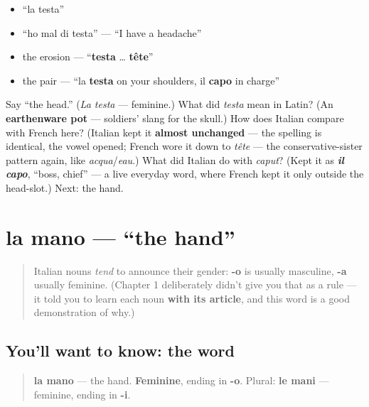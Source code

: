 \begin{itemize}
\raggedright
  \item \textquotedblleft{}la testa\textquotedblright{}
  \item \textquotedblleft{}ho mal di testa\textquotedblright{} — \textquotedblleft{}I have a headache\textquotedblright{}
  \item the erosion — \textquotedblleft{}\textbf{testa} … \textbf{tête}\textquotedblright{}
  \item the pair — \textquotedblleft{}la \textbf{testa} on your shoulders, il \textbf{capo} in charge\textquotedblright{}
\end{itemize}

\begin{tcolorbox}[breakable,colback=teal!4,colframe=teal!35!black,title={Before you move on}]
Say \textquotedblleft{}the head.\textquotedblright{} (\emph{La testa} — feminine.) What did \emph{testa} mean in Latin? (An \textbf{earthenware pot} — soldiers' slang for the skull.) How does Italian compare with French here? (Italian kept it \textbf{almost unchanged} — the spelling is identical, the vowel opened; French wore it down to \emph{tête} — the conservative-sister pattern again, like \emph{acqua}/\emph{eau}.) What did Italian do with \emph{caput}? (Kept it as \emph{\textbf{il capo}}, \textquotedblleft{}boss, chief\textquotedblright{} — a live everyday word, where French kept it only outside the head-slot.) Next: the hand.
\end{tcolorbox}
\section[la mano]{la mano — \textquotedblleft{}the hand\textquotedblright{}}

\label{lesson:IT-C17-mano}



\begin{quote}
Italian nouns \emph{tend} to announce their gender: \textbf{-o} is usually masculine, \textbf{-a} usually feminine. (Chapter 1 deliberately didn't give you that as a rule — it told you to learn each noun \textbf{with its article}, and this word is a good demonstration of why.)
\end{quote}

\subsection*{You'll want to know: the word}
\begin{quote}
\textbf{la mano} — the hand. \textbf{Feminine}, ending in \textbf{-o}. Plural: \textbf{le mani} — feminine, ending in \textbf{-i}.
\end{quote}

